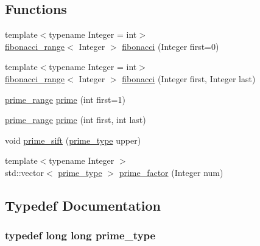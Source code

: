 \subsection*{\-Functions}
\begin{DoxyCompactItemize}
\item 
{\footnotesize template$<$typename Integer  = int$>$ }\\\hyperlink{classyuh_1_1fibonacci__range}{fibonacci\-\_\-range}$<$ \-Integer $>$ \hyperlink{namespaceyuh_a11988532f81d143e1b5b74d461dd8067}{fibonacci} (\-Integer first=0)
\item 
{\footnotesize template$<$typename Integer  = int$>$ }\\\hyperlink{classyuh_1_1fibonacci__range}{fibonacci\-\_\-range}$<$ \-Integer $>$ \hyperlink{namespaceyuh_a17b1d33879798b95bdefe171df90380a}{fibonacci} (\-Integer first, \-Integer last)
\item 
\hyperlink{classyuh_1_1prime__range}{prime\-\_\-range} \hyperlink{namespaceyuh_ad0e08caa71b8e5172b1535657bbc0648}{prime} (int first=1)
\item 
\hyperlink{classyuh_1_1prime__range}{prime\-\_\-range} \hyperlink{namespaceyuh_a31e810e0c57ef83ca515b12f1aac0bf3}{prime} (int first, int last)
\item 
void \hyperlink{namespaceyuh_ac7fcc7fa46bf6b7cf12a53a653b23317}{prime\-\_\-sift} (\hyperlink{namespaceyuh_af542f8440602da42322ddb7ea8242336}{prime\-\_\-type} upper)
\item 
{\footnotesize template$<$typename Integer $>$ }\\std\-::vector$<$ \hyperlink{namespaceyuh_af542f8440602da42322ddb7ea8242336}{prime\-\_\-type} $>$ \hyperlink{namespaceyuh_a25df23e130603e9f5810c1d671e71614}{prime\-\_\-factor} (\-Integer num)
\end{DoxyCompactItemize}


\subsection{\-Typedef \-Documentation}
\hypertarget{namespaceyuh_af542f8440602da42322ddb7ea8242336}{
\subsubsection[{prime\-\_\-type}]{\setlength{\rightskip}{0pt plus 5cm}typedef long long {\bf prime\-\_\-type}}}\label{d5/d2b/namespaceyuh_af542f8440602da42322ddb7ea8242336}


